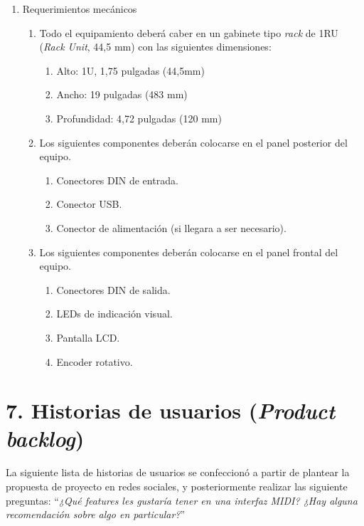 \documentclass[
11pt, %
]{charter}
\begin{document}
\begin{enumerate}
	\item Requerimientos mecánicos
	\begin{enumerate}
		\item Todo el equipamiento deberá caber en un gabinete tipo \emph{rack} de 1RU (\emph{Rack Unit}, 44,5 mm) con las siguientes dimensiones:
		\begin{enumerate}
			\item Alto: 1U, 1,75 pulgadas (44,5mm)
			\item Ancho: 19 pulgadas (483 mm)
			\item Profundidad: 4,72 pulgadas (120 mm)
		\end{enumerate}
		\item Los siguientes componentes deberán colocarse en el panel posterior del equipo.
		\begin{enumerate}
			\item Conectores DIN de entrada.
			\item Conector USB.
			\item Conector de alimentación (si llegara a ser necesario).
		\end{enumerate}
		\item Los siguientes componentes deberán colocarse en el panel frontal del equipo.
		\begin{enumerate}
			\item Conectores DIN de salida.
			\item LEDs de indicación visual.
			\item Pantalla LCD.
			\item Encoder rotativo.
		\end{enumerate}
	\end{enumerate}
\end{enumerate}

\section{7. Historias de usuarios (\textit{Product backlog})}
\label{sec:backlog}

La siguiente lista de historias de usuarios se confeccionó a partir de plantear la propuesta de proyecto en redes sociales, y posteriormente realizar las siguiente preguntas:
``\emph{¿Qué features les gustaría tener en una interfaz MIDI? ¿Hay alguna recomendación sobre algo en particular?}''
\end{document}
